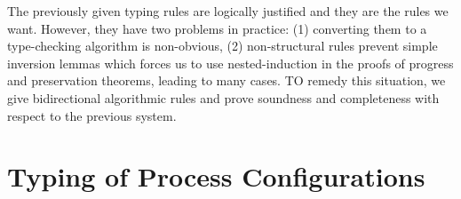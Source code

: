 \documentclass[11pt]{article}
\theoremstyle{plain}
\theoremstyle{definition}
\theoremstyle{remark}
\DeclarePairedDelimiter\parens{(}{)}             %
\DeclarePairedDelimiter\braces{\lbrace}{\rbrace} %
\newcommand\indexVar{x}
\newcommand\lolli{\multimap}
\newcommand\terminate{\mathbf{1}}
\newcommand\tensor{\otimes}
\newcommand\lab{lab}
\newcommand\internal{\oplus}
\newcommand\external{\&}
\newcommand\internals[2]{\internal\braces{\lab_\indexVar : {#1}_\indexVar}_{\indexVar \in #2}}
\newcommand\externals[2]{\external\braces{\lab_\indexVar : {#1}_\indexVar}_{\indexVar \in #2}}
\newcommand\seq{\;;\;}
\newcommand\tbranches[2]{\braces{\lab_\indexVar \rightarrow {#1}_\indexVar}_{\indexVar \in #2}}
\newcommand\tfwd[2]{#1 \leftarrow #2}
\newcommand\tspawn[3]{#1 \leftarrow #2 \seq #3}
\newcommand\tclose[1]{\mathrm{close}\;#1}
\newcommand\twait[2]{\mathrm{wait}\;#1 \seq #2}
\newcommand\tsend[4]{\mathrm{send}\; #1 \; \parens{#2 \leftarrow #3} \seq #4}
\newcommand\trecv[3]{#1 \leftarrow \mathrm{recv} \; #2 \seq #3}
\newcommand\tcase[2]{\mathrm{case}\;#1\;\mathrm{of}\;#2}
\newcommand\tselect[3]{#1 . \lab_{#2} \seq #3}
\newcommand\irb[1]{\texttt{#1}}
\newcommand\Right{\irb{R}}
\newcommand\Left{\irb{L}}
\newcommand\id{\irb{id}}
\newcommand\cut{\irb{cut}}
\newcommand{\emptyCtx}{\emptyset}
\newcommand{\ctx}{\Psi}
\newcommand\typeProc[3]{#1 :: \parens{#2 : #3}}
\newcommand\typeS[4]{#1 \vdash \typeProc{#2}{#3}{#4}}
\newcommand\typeSJ{\typeS{\ctx}}
\newcommand\syn[4]{#1 \Vdash #2 :: #3 \Rightarrow #4}
\begin{document}
The previously given typing rules are logically justified and they are the rules we want. However, they have two problems in practice: (1) converting them to a type-checking algorithm is non-obvious, (2) non-structural rules prevent simple inversion lemmas which forces us to use nested-induction in the proofs of progress and preservation theorems, leading to many cases. TO remedy this situation, we give bidirectional algorithmic rules and prove soundness and completeness with respect to the previous system.



\section{Typing of Process Configurations}
\end{document}
